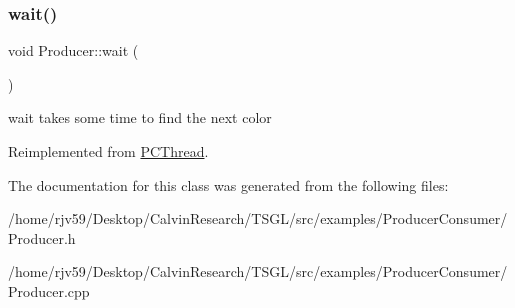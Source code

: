 \subsubsection{\texorpdfstring{wait()}{wait()}}
{\footnotesize\ttfamily void Producer\+::wait (\begin{DoxyParamCaption}{ }\end{DoxyParamCaption})\hspace{0.3cm}{\ttfamily [virtual]}}

wait takes some time to find the next color 

Reimplemented from \hyperlink{class_p_c_thread}{P\+C\+Thread}.



The documentation for this class was generated from the following files\+:\begin{DoxyCompactItemize}
\item 
/home/rjv59/\+Desktop/\+Calvin\+Research/\+T\+S\+G\+L/src/examples/\+Producer\+Consumer/Producer.\+h\item 
/home/rjv59/\+Desktop/\+Calvin\+Research/\+T\+S\+G\+L/src/examples/\+Producer\+Consumer/Producer.\+cpp\end{DoxyCompactItemize}
